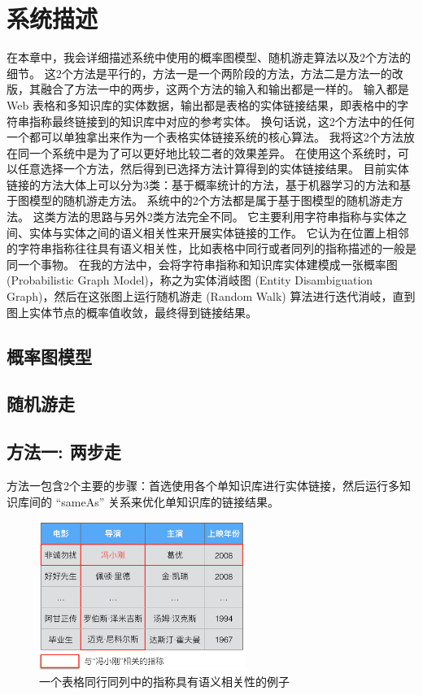 \chapter{系统描述}

在本章中，我会详细描述系统中使用的概率图模型、随机游走算法以及2个方法的细节。
这2个方法是平行的，方法一是一个两阶段的方法，方法二是方法一的改版，其融合了方法一中的两步，这两个方法的输入和输出都是一样的。
输入都是 Web 表格和多知识库的实体数据，输出都是表格的实体链接结果，即表格中的字符串指称最终链接到的知识库中对应的参考实体。
换句话说，这2个方法中的任何一个都可以单独拿出来作为一个表格实体链接系统的核心算法。
我将这2个方法放在同一个系统中是为了可以更好地比较二者的效果差异。
在使用这个系统时，可以任意选择一个方法，然后得到已选择方法计算得到的实体链接结果。
目前实体链接的方法大体上可以分为3类：基于概率统计的方法，基于机器学习的方法和基于图模型的随机游走方法。
系统中的2个方法都是属于基于图模型的随机游走方法。
这类方法的思路与另外2类方法完全不同。
它主要利用字符串指称与实体之间、实体与实体之间的语义相关性来开展实体链接的工作。
它认为在位置上相邻的字符串指称往往具有语义相关性，比如表格中同行或者同列的指称描述的一般是同一个事物。
在我的方法中，会将字符串指称和知识库实体建模成一张概率图 (Probabilistic Graph Model)，称之为实体消岐图 (Entity Disambiguation Graph)，然后在这张图上运行随机游走 (Random Walk) 算法进行迭代消岐，直到图上实体节点的概率值收敛，最终得到链接结果。


\section{概率图模型}




\section{随机游走}




\section{方法一: 两步走}

方法一包含2个主要的步骤：首选使用各个单知识库进行实体链接，然后运行多知识库间的 ``sameAs'' 关系来优化单知识库的链接结果。

\begin{figure}[htbp]
\centering
\includegraphics[width=0.6\textwidth]{img/relate}
\caption{一个表格同行同列中的指称具有语义相关性的例子}
\label{relate}
\end{figure}


